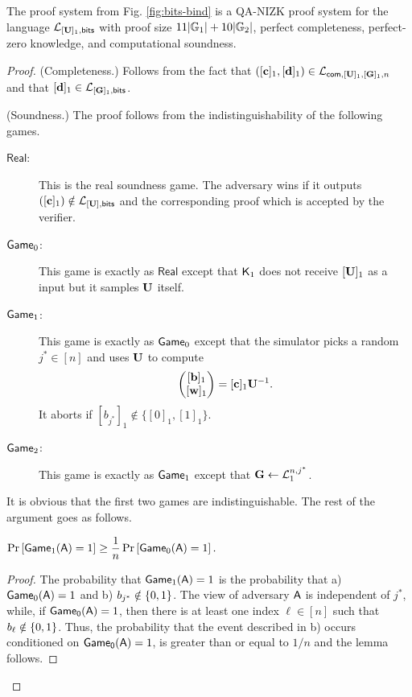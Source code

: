 \begin{theorem} \label{theo:bits-bind} The proof system from Fig. \ref{fig:bits-bind} is a QA-NIZK proof system for the language $\mathcal{L}_{[\mathbf{{U}}]_1,\mathsf{bits}}$ with proof size  
$11|\mathbb{G}_1|+10|\mathbb{G}_2|$, perfect completeness, perfect-zero knowledge, and computational soundness. 
\end{theorem}

\begin{proof}
(Completeness.)
Follows from the fact that $([\mathbf{c}]_1,[\mathbf{d}]_1)\in\mathcal{L}_{\mathsf{com},[\mathbf{{U}}]_1,[\mathbf{{G}}]_1,n}$ and that $[\mathbf{d}]_1\in\mathcal{L}_{[\mathbf{{G}}]_1,\mathsf{bits}}$.

(Soundness.)
The proof follows from the indistinguishability of the following games.

\begin{description}
\item[$\mathsf{Real}$:] This is the real soundness game. The adversary wins if it outputs $([\mathbf{c}]_1)\notin\mathcal{L}_{[\mathbf{{U}}],\mathsf{bits}}$ and the corresponding proof which is accepted by the verifier.
\item[$\mathsf{Game}_0$:] This game is exactly as $\mathsf{Real}$ except that $\mathsf{K}_1$ does not receive $[\mathbf{{U}}]_1$ as a input but it samples $\mathbf{{U}}$ itself.
\item[$\mathsf{Game}_1$:] This game is exactly as $\mathsf{Game}_0$ except that the simulator picks a random $j^*\in[n]$ and uses $\mathbf{{U}}$ to compute
$$
\left(\begin{matrix}{[\mathbf{b}]_1}\\{[\mathbf{w}]_1}\end{matrix}\right) = [\mathbf{c}]_1\mathbf{{U}}^{-1}.
$$
It aborts if $[b_{j^*}]_1\notin\{[0]_1,[1]_1\}$.
\item[$\mathsf{Game}_2$:] This game is exactly as $\mathsf{Game}_1$ except that ${\mathbf{{G}}}\gets\mathcal{L}_1^{n, j^*}$.
\end{description}

It is obvious that the first two games are indistinguishable. 
The rest of the argument goes as follows. 

\begin{lemma} $\Pr\left[ \mathsf{Game}_1(\mathsf{A})=1\right]\geq\dfrac{1}{n}\Pr\left[\mathsf{Game}_0(\mathsf{A})=1\right].$
\end{lemma}

\begin{proof}  The probability that
 $\mathsf{Game}_1(\mathsf{A})=1$ is the probability that  a) $\mathsf{Game}_0(\mathsf{A})=1$ and
b)  $b_{j^*} \notin \{0,1\}$. The view of adversary $\mathsf{A}$ is independent of $j^*$, while, if $\mathsf{Game_0}(\mathsf{A})=1$, then there is at least one index $\ell \in [n]$ such that $b_\ell\notin\{0,1\}$. Thus, 
the probability that the event described in b) occurs conditioned on $\mathsf{Game_0}(\mathsf{A})=1$, is greater than or equal to $1/n$ and the lemma follows.
\end{proof}


\end{proof}
